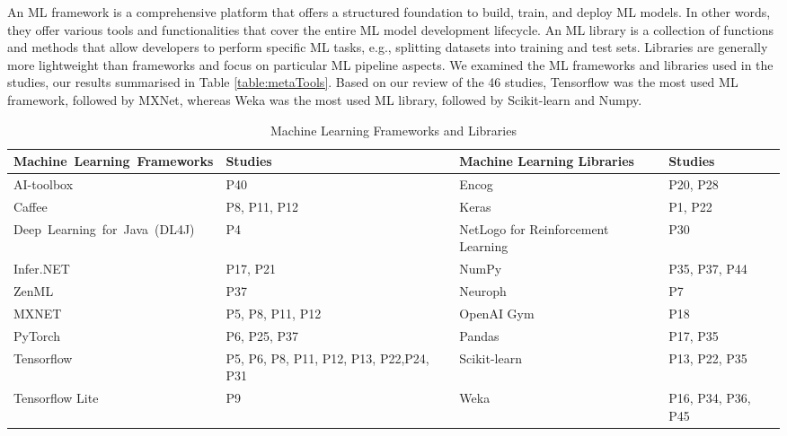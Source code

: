 An ML framework is a comprehensive platform that offers a structured foundation to build, train, and deploy ML models. In other words, they offer various tools and functionalities that cover the entire ML model development lifecycle. An ML library is a collection of functions and methods that allow developers to perform specific ML tasks, e.g., splitting datasets into training and test sets. Libraries are generally more lightweight than frameworks and focus on particular ML pipeline aspects. We examined the ML frameworks and libraries used in the studies, our results summarised in Table \ref{table:metaTools}. Based on our review of the 46 studies, Tensorflow was the most used ML framework, followed by MXNet, whereas Weka was the most used ML library, followed by Scikit-learn and Numpy.



\begin{table}[htb]
\centering
\caption{Machine Learning Frameworks and Libraries}
\footnotesize
\begin{tabular}{ p{4cm} p{3.5cm} | p{4cm} p{3.2cm} } 
\hline
\textbf{\mbox{Machine Learning Frameworks}} & \textbf{Studies} & \textbf{Machine Learning Libraries} & \textbf{Studies}\TBstrut \\
\hline
AI-toolbox & P40  &                             Encog	& P20, P28  \TBstrut \\ 
Caffee & P8, P11, P12  &                        Keras	& P1, P22  \TBstrut \\                                                       
\mbox{Deep Learning for Java (DL4J)} &	P4 &    NetLogo for Reinforcement Learning	& P30   \TBstrut \\
Infer.NET &	P17, P21 &                          NumPy	& P35, P37, P44 \TBstrut \\
ZenML	& P37    &                              Neuroph &	P7  \TBstrut \\ 
MXNET	& P5, P8, P11, P12 &                    OpenAI Gym &	P18  \TBstrut \\ 
PyTorch	& P6, P25, P37    &                     Pandas	& P17, P35      \TBstrut \\ 
Tensorflow	 & P5, P6, P8, P11, P12, P13, P22,P24, P31 &   Scikit-learn & P13, P22, P35 \TBstrut \\ 
Tensorflow Lite	& P9 &                         Weka	& P16, P34, P36, P45 \TBstrut \\

\hline
\end{tabular}
\label{table:MLframeworks}
\end{table}

